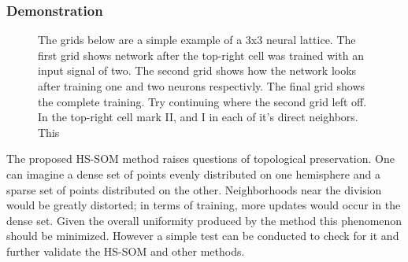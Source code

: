 \documentclass[12pt]{article}
\begin{document}
\subsubsection{Demonstration}

\begin{figure}
\centering
{}
\caption{The grids below are a simple example of a 3x3 neural lattice.  The first grid shows network after the top-right cell was trained with an input signal of two.  The second grid shows how the network looks after training one and two neurons respectivly. The final grid shows the complete training.  Try continuing where the second grid left off.  In the top-right cell mark II, and I in each of it's direct neighbors.  This }

\end{figure}

The proposed HS-SOM method raises questions of topological preservation.  
One can imagine a dense set of points evenly distributed on one hemisphere and a
sparse set of points distributed on the other. Neighborhoods near the division
would be greatly distorted; in terms of training, more updates would occur in
the dense set.  Given the overall uniformity produced by the
\citeauthor{Rakhmanov94} method this phenomenon should be minimized. However a
simple test can be conducted to check for it and further validate the HS-SOM
and other methods.
\end{document}
